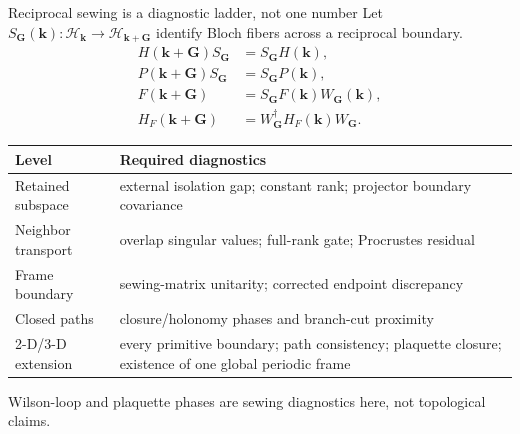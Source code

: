 \documentclass[aspectratio=169,10pt]{beamer}
\begin{document}
\begin{frame}{Reciprocal sewing is a diagnostic ladder, not one number}
  \small
  Let $S_{\mathbf G}(\mathbf k):\mathcal H_{\mathbf k}\rightarrow
  \mathcal H_{\mathbf k+\mathbf G}$ identify Bloch fibers across a reciprocal boundary.
  \begin{align*}
    H(\mathbf k+\mathbf G)S_{\mathbf G}&=S_{\mathbf G}H(\mathbf k),\\
    P(\mathbf k+\mathbf G)S_{\mathbf G}&=S_{\mathbf G}P(\mathbf k),\\
    F(\mathbf k+\mathbf G)&=S_{\mathbf G}F(\mathbf k)W_{\mathbf G}(\mathbf k),\\
    H_F(\mathbf k+\mathbf G)&=W_{\mathbf G}^\dagger
      H_F(\mathbf k)W_{\mathbf G}.
  \end{align*}
  \begin{tabular}{p{}p{}}
    \toprule
    Level & Required diagnostics\\
    \midrule
    Retained subspace & external isolation gap; constant rank; projector boundary covariance\\
    Neighbor transport & overlap singular values; full-rank gate; Procrustes residual\\
    Frame boundary & sewing-matrix unitarity; corrected endpoint discrepancy\\
    Closed paths & closure/holonomy phases and branch-cut proximity\\
    2-D/3-D extension & every primitive boundary; path consistency; plaquette closure;
      existence of one global periodic frame\\
    \bottomrule
  \end{tabular}

  \centering
  Wilson-loop and plaquette phases are sewing diagnostics here, not topological claims.
\end{frame}
\end{document}
